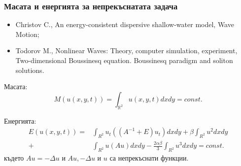 \documentclass{beamer}
\newcommand{\RR}{\mathbb{R}}
\begin{document}
\begin{frame}
\frametitle{Масата и енергията за непрекъснатата задача }
\begin{itemize}
\item {\footnotesize Christov C., An energy-consistent dispersive shallow-water model, Wave Motion;}
\item {\footnotesize Todorov M., Nonlinear Waves: Theory, computer simulation, experiment, Two-dimensional Boussinesq equation. Boussinesq paradigm and soliton solutions.}
\end{itemize}
Масата:
\begin{equation}\label{intM}
M(u(x,y,t))=\int_{\RR^2} u(x,y,t)dx dy = const.
\end{equation}

Енергията:
\begin{align}\label{ex-en}
E(u(x,y,t)) = &\int_{R^2} u_t \left((A^{-1}+E)u_t\right) dxdy+
\beta \int_{R^2} u^2 dxdy \nonumber\\
+& \int_{R^2}u \left(A u\right) dxdy
-\frac{2 \alpha \beta}{3} \int_{R^2} u^3 dxdy =const.
\end{align}
където $Au=-\Delta u$ и $Au,-\Delta u$ и $u$ са непрекъснати функции.

\end{frame}

\end{document}
